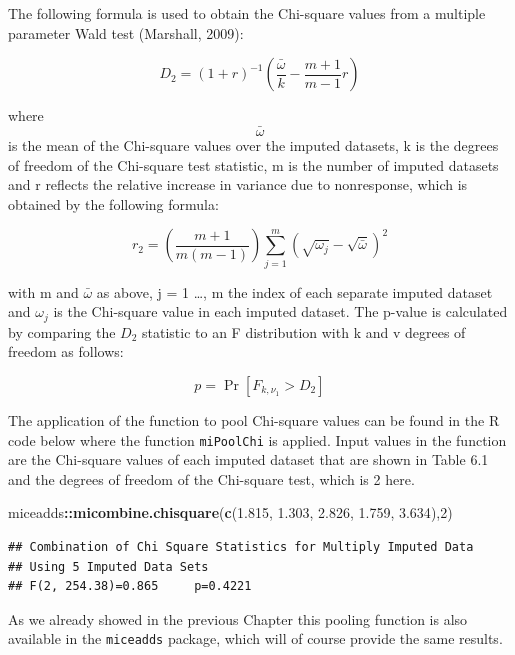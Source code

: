 \documentclass[]{book}
\newenvironment{Shaded}{\begin{snugshade}}{\end{snugshade}}
\newcommand{\KeywordTok}[1]{\textcolor[rgb]{0.13,0.29,0.53}{\textbf{#1}}}
\newcommand{\DecValTok}[1]{\textcolor[rgb]{0.00,0.00,0.81}{#1}}
\newcommand{\FloatTok}[1]{\textcolor[rgb]{0.00,0.00,0.81}{#1}}
\newcommand{\OperatorTok}[1]{\textcolor[rgb]{0.81,0.36,0.00}{\textbf{#1}}}
\newcommand{\NormalTok}[1]{#1}
\begin{document}
The following formula is used to obtain the Chi-square values from a
multiple parameter Wald test (Marshall, 2009):

\begin{equation}
 D_2 = (1+r)^{-1} (\frac{ \bar\omega}{k}-\frac{ m+1}{m-1}r)
  \label{eq:d2}
\end{equation}

where \[\bar\omega\] is the mean of the Chi-square values over the
imputed datasets, k is the degrees of freedom of the Chi-square test
statistic, m is the number of imputed datasets and r reflects the
relative increase in variance due to nonresponse, which is obtained by
the following formula:

\[r_2 = \left(\frac{m+1}{m(m-1)}\right)\sum_{j=1}^m\left(\sqrt{\omega_j}-{\sqrt{\bar\omega}}\right)^2\]

with m and \(\bar\omega\) as above, j = 1 \ldots{}, m the index of each
separate imputed dataset and \(\omega_j\) is the Chi-square value in
each imputed dataset. The p-value is calculated by comparing the \(D_2\)
statistic to an F distribution with k and v degrees of freedom as
follows:

\[p = \Pr[F_{k,\nu_1}>D_2]\]

The application of the function to pool Chi-square values can be found
in the R code below where the function \texttt{miPoolChi} is applied.
Input values in the function are the Chi-square values of each imputed
dataset that are shown in Table 6.1 and the degrees of freedom of the
Chi-square test, which is 2 here.

\begin{Shaded}
\begin{Highlighting}[]
\NormalTok{miceadds}\OperatorTok{::}\KeywordTok{micombine.chisquare}\NormalTok{(}\KeywordTok{c}\NormalTok{(}\FloatTok{1.815}\NormalTok{,}
            \FloatTok{1.303}\NormalTok{,}
            \FloatTok{2.826}\NormalTok{,}
            \FloatTok{1.759}\NormalTok{,}
            \FloatTok{3.634}\NormalTok{),}\DecValTok{2}\NormalTok{)}
\end{Highlighting}
\end{Shaded}

\begin{verbatim}
## Combination of Chi Square Statistics for Multiply Imputed Data
## Using 5 Imputed Data Sets
## F(2, 254.38)=0.865     p=0.4221
\end{verbatim}

As we already showed in the previous Chapter this pooling function is
also available in the \texttt{miceadds} package, which will of course
provide the same results.
\end{document}
